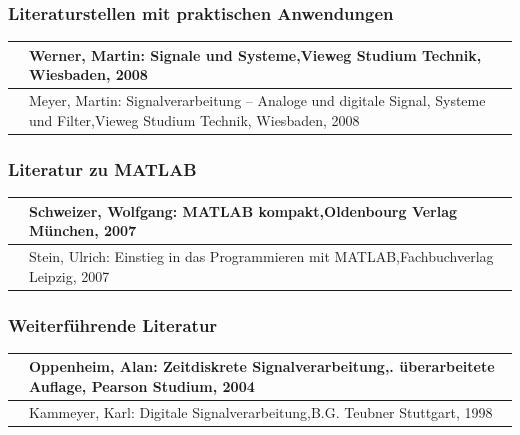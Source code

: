 \subsubsection{ Literaturstellen mit praktischen Anwendungen}

\begin{tabular}{|p{0.6in}|p{5.7in}|} \hline 
[Wern08] & Werner, Martin: Signale und Systeme,\newline Vieweg Studium Technik, Wiesbaden, 2008 \\ \hline 
[Meye08] & Meyer, Martin: Signalverarbeitung -- Analoge und digitale Signal, Systeme und Filter,\newline Vieweg Studium Technik, Wiesbaden, 2008 \\ \hline 
\end{tabular}


\subsubsection{ Literatur zu MATLAB}

\begin{tabular}{|p{0.6in}|p{5.7in}|} \hline 
[Schw07] & Schweizer, Wolfgang: MATLAB kompakt,\newline Oldenbourg Verlag M\"{u}nchen, 2007 \\ \hline 
[Stei07] & Stein, Ulrich: Einstieg in das Programmieren mit MATLAB,\newline Fachbuchverlag Leipzig, 2007 \\ \hline 
\end{tabular}


\subsubsection{ Weiterf\"{u}hrende Literatur}

\begin{tabular}{|p{0.6in}|p{5.7in}|} \hline 
[Oppe04] & Oppenheim, Alan: Zeitdiskrete Signalverarbeitung,\newline 2. \"{u}berarbeitete Auflage, Pearson Studium, 2004 \\ \hline 
[Kamm98] & Kammeyer, Karl: Digitale Signalverarbeitung,\newline B.G. Teubner Stuttgart, 1998 \\ \hline 
\end{tabular}

